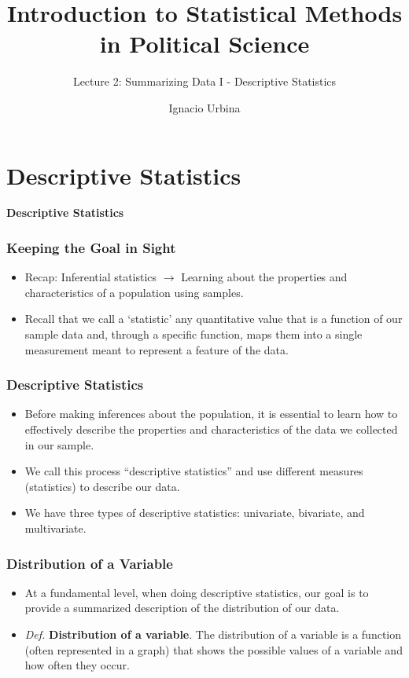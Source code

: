 \documentclass[handout]{beamer} %
\title{Introduction to Statistical Methods in Political Science}
\subtitle{Lecture 2: Summarizing Data I - Descriptive Statistics}
\author{Ignacio Urbina}
\date{}
\newcommand{\transitionslide}[1]{
    \begin{frame}[plain]
          \addtocounter{framenumber}{-1}
        \centering
        \vspace{1cm}
        \Huge
        \textcolor{moonstoneblue!150}{\textbf{#1}}
    \end{frame}
}
\begin{document}
\frame{\titlepage}

\section{Descriptive Statistics}
\transitionslide{Descriptive Statistics}

\begin{frame}
\frametitle{Keeping the Goal in Sight}
\begin{itemize}
\item Recap: Inferential statistics $\rightarrow$ Learning about the properties and characteristics of a population using samples.
\item Recall that we call a `statistic' any quantitative value that is a function of our sample data and, through a specific function, maps them into a single measurement meant to represent a feature of the data.
\end{itemize}
\end{frame}

\begin{frame}
\frametitle{Descriptive Statistics}
\begin{itemize}
\item Before making inferences about the population, it is essential to learn how to effectively describe the properties and characteristics of the data we collected in our sample.
\item We call this process “descriptive statistics” and use different measures (statistics) to describe our data.
\item We have three types of descriptive statistics: univariate, bivariate, and multivariate.
\end{itemize}
\end{frame}

\begin{frame}
\frametitle{Distribution of a Variable}
\begin{itemize}
\item At a fundamental level, when doing descriptive statistics, our goal is to provide a summarized description of the distribution of our data.
\item \emph{Def.} \textbf{Distribution of a variable}. The distribution of a variable is a function (often represented in a graph) that shows the possible values of a variable and how often they occur.
\end{itemize}
\end{frame}
\end{document}
